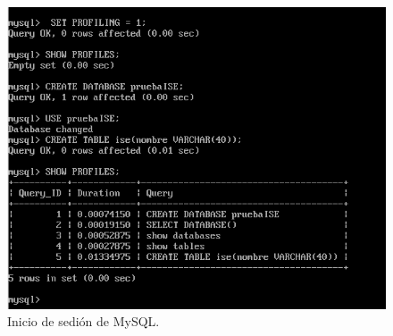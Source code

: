 \begin{figure}[H] %
	\centering
	\includegraphics[scale=0.5]{imagenes/profiler-mysql.png}  %
	\caption{Inicio de sedión de MySQL.}
\end{figure}

\newpage




